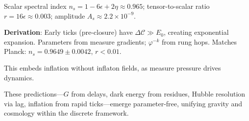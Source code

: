 \documentclass[twocolumn,prd,amsmath,amssymb,aps,superscriptaddress,nofootinbib]{revtex4-2}
\begin{document}
Scalar spectral index $n_s = 1 - 6\epsilon + 2\eta \approx 0.965$; tensor-to-scalar ratio $r = 16\epsilon \approx 0.003$; amplitude $A_s \approx 2.2 \times 10^{-9}$.

\textbf{Derivation}: Early ticks (pre-closure) have $\Delta \mathcal{C} \gg E_0$, creating exponential expansion. Parameters from measure gradients; $\varphi^{-k}$ from rung hops. Matches Planck: $n_s = 0.9649 \pm 0.0042$, $r < 0.01$.

This embeds inflation without inflaton fields, as measure pressure drives dynamics.

These predictions—$G$ from delays, dark energy from residues, Hubble resolution via lag, inflation from rapid ticks—emerge parameter-free, unifying gravity and cosmology within the discrete framework.
\end{document}
